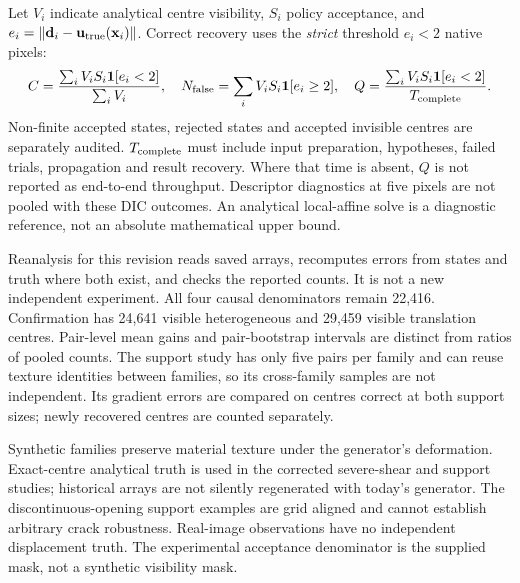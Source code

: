 Let $V_i$ indicate analytical centre visibility, $S_i$ policy acceptance, and $e_i=\|\mathbf d_i-\mathbf u_{\rm true}(\mathbf x_i)\|$. Correct recovery uses the \emph{strict} threshold $e_i<2$ native pixels:
\begin{equation}
C=\frac{\sum_i V_iS_i\mathbf1[e_i<2]}{\sum_i V_i},\quad
N_{\rm false}=\sum_i V_iS_i\mathbf1[e_i\geq2],\quad
Q=\frac{\sum_i V_iS_i\mathbf1[e_i<2]}{T_{\rm complete}}.
\label{eq:metrics}
\end{equation}
Non-finite accepted states, rejected states and accepted invisible centres are separately audited. $T_{\rm complete}$ must include input preparation, hypotheses, failed trials, propagation and result recovery. Where that time is absent, $Q$ is not reported as end-to-end throughput. Descriptor diagnostics at five pixels are not pooled with these DIC outcomes. An analytical local-affine solve is a diagnostic reference, not an absolute mathematical upper bound.

Reanalysis for this revision reads saved arrays, recomputes errors from states and truth where both exist, and checks the reported counts. It is not a new independent experiment. All four causal denominators remain 22,416. Confirmation has 24,641 visible heterogeneous and 29,459 visible translation centres. Pair-level mean gains and pair-bootstrap intervals are distinct from ratios of pooled counts. The support study has only five pairs per family and can reuse texture identities between families, so its cross-family samples are not independent. Its gradient errors are compared on centres correct at both support sizes; newly recovered centres are counted separately.

Synthetic families preserve material texture under the generator's deformation. Exact-centre analytical truth is used in the corrected severe-shear and support studies; historical arrays are not silently regenerated with today's generator. The discontinuous-opening support examples are grid aligned and cannot establish arbitrary crack robustness. Real-image observations have no independent displacement truth. The experimental acceptance denominator is the supplied mask, not a synthetic visibility mask.
